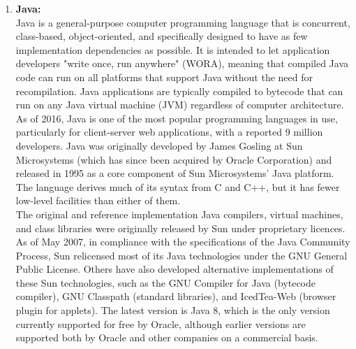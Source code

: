 \documentclass[10pt,a4paper]
{article}
\numberwithin{table}{section}
\begin{document}
{{\begin{normalsize}
\begin{enumerate}
\hspace*{0.3cm}Servlets are most often used to process or store a Java class in Java EE that conforms to the Java Servlet API, a standard for implementing Java classes which respond to requests. Servlets could in principle communicate over any client–server protocol, but they are most often used with the HTTP protocol. Thus "servlet" is often used as shorthand for "HTTP servlet".Thus, a software developer may use a servlet to add dynamic content to a web server using the Java platform. The generated content is commonly HTML, but may be other data such as XML. Servlets can maintain state in session variables across many server transactions by using HTTP cookies, or rewriting URLs.

\item \textbf{Java:}\\
\hspace*{0.3cm}Java is a general-purpose computer programming language that is concurrent, class-based, object-oriented, and specifically designed to have as few implementation dependencies as possible. It is intended to let application developers "write once, run anywhere" (WORA), meaning that compiled Java code can run on all platforms that support Java without the need for recompilation. Java applications are typically compiled to bytecode that can run on any Java virtual machine (JVM) regardless of computer architecture. As of 2016, Java is one of the most popular programming languages in use, particularly for client-server web applications, with a reported 9 million developers. Java was originally developed by James Gosling at Sun Microsystems (which has since been acquired by Oracle Corporation) and released in 1995 as a core component of Sun Microsystems' Java platform. The language derives much of its syntax from C and C++, but it has fewer low-level facilities than either of them.\\
\hspace*{0.3cm}The original and reference implementation Java compilers, virtual machines, and class libraries were originally released by Sun under proprietary licences. As of May 2007, in compliance with the specifications of the Java Community Process, Sun relicensed most of its Java technologies under the GNU General Public License. Others have also developed alternative implementations of these Sun technologies, such as the GNU Compiler for Java (bytecode compiler), GNU Classpath (standard libraries), and IcedTea-Web (browser plugin for applets).
The latest version is Java 8, which is the only version currently supported for free by Oracle, although earlier versions are supported both by Oracle and other companies on a commercial basis.


\end{enumerate}
\end{normalsize}}}
\end{document}

